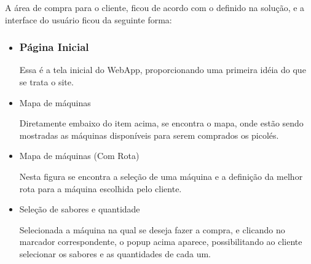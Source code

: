 A área de compra para o cliente, ficou de acordo com o definido na solução, e a interface do usuário ficou da seguinte forma:

\begin{itemize}
\item

\subsubsection{Página Inicial}


Essa é a tela inicial do WebApp, proporcionando uma primeira idéia do que se trata o site.

\item{Mapa de máquinas}


Diretamente embaixo do item acima, se encontra o mapa, onde estão sendo mostradas as máquinas disponíveis para serem comprados os picolés.

\item{Mapa de máquinas (Com Rota)}


Nesta figura se encontra a seleção de uma máquina e a definição da melhor rota para a máquina escolhida pelo cliente.


\item{Seleção de sabores e quantidade}


Selecionada a máquina na qual se deseja fazer a compra, e clicando no marcador correspondente, o popup acima aparece, possibilitando ao cliente selecionar os sabores e as quantidades de cada um.



\end{itemize}

